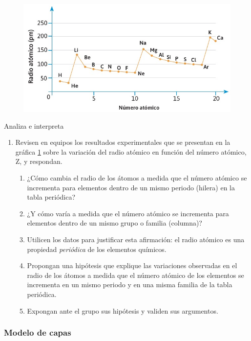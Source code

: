 \documentclass[11pt]{book}
\begin{document}
\begin{figure}[H]
  \centering
  \includegraphics[width=0.8\linewidth]{radio_numero.jpg}
  \label{fig:radio_numero}
\end{figure}%

\begin{boxF}
  Analiza e interpreta
  \begin{enumerate}
    \item Revisen en equipos los resultados experimentales que se presentan en la gráfica \ref{fig:radio_numero} sobre la variación del radio atómico en función del número atómico, Z, y respondan.
          \begin{enumerate}
            \item ¿Cómo cambia el radio de los átomos a medida que el número atómico se incrementa para elementos dentro de un mismo periodo (hilera) en la tabla periódica?
            \item ¿Y cómo varía a medida que el número atómico se incrementa para elementos dentro de un mismo grupo o familia (columna)?
            \item Utilicen los datos para justificar esta afirmación: el radio atómico es una propiedad \emph{periódica} de los elementos químicos.
            \item Propongan una hipótesis que explique las variaciones observadas en el radio de los átomos a medida que el número atómico de los elementos se incrementa en un mismo periodo y en una misma familia de la tabla periódica.
            \item Expongan ante el grupo sus hipótesis y validen sus argumentos.
          \end{enumerate}

  \end{enumerate}
\end{boxF}

\subsubsection{Modelo de capas}
\end{document}
